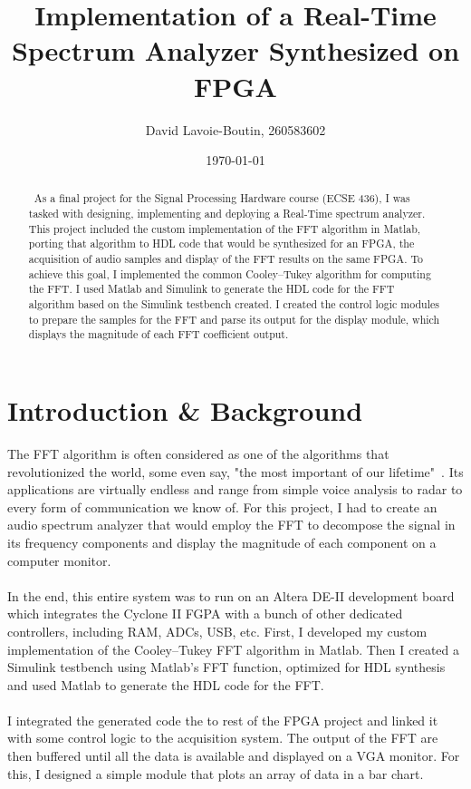 \documentclass[letterpaper, titlepage, 11pt]{article}
\title{Implementation of a Real-Time Spectrum Analyzer Synthesized on FPGA}
\author{David Lavoie-Boutin, 260583602}
\date{\today}
\begin{document}
\maketitle
\begin{abstract}\
As a final project for the Signal Processing Hardware course (ECSE 436), I was tasked with designing, implementing and deploying a Real-Time spectrum analyzer. This project included the custom implementation of the FFT algorithm in Matlab, porting that algorithm to HDL code that would be synthesized for an FPGA, the acquisition of audio samples and display of the FFT results on the same FPGA. To achieve this goal, I implemented the common Cooley–Tukey algorithm for computing the FFT. I used Matlab and Simulink to generate the HDL code for the FFT algorithm based on the Simulink testbench created. I created the control logic modules to prepare the samples for the FFT and parse its output for the display module, which displays the magnitude of each FFT coefficient output.
\end{abstract}

\tableofcontents
\clearpage

\section{Introduction \& Background}
The FFT algorithm is often considered as one of the algorithms that revolutionized the world, some even say, "the most important of our lifetime"~\cite{important}. Its applications are virtually endless and range from simple voice analysis to radar to every form of communication we know of. For this project, I had to create an audio spectrum analyzer that would employ the FFT to decompose the signal in its frequency components and display the magnitude of each component on a computer monitor. \\
\\
In the end, this entire system was to run on an Altera DE-II development board which integrates the Cyclone II FGPA with a bunch of other dedicated controllers, including RAM, ADCs, USB, etc. First, I developed my custom implementation of the Cooley–Tukey FFT algorithm in Matlab. Then I created a Simulink testbench using Matlab's FFT function, optimized for HDL synthesis and used Matlab to generate the HDL code for the FFT.\\
\\
I integrated the generated code the to rest of the FPGA project and linked it with some control logic to the acquisition system. The output of the FFT are then buffered until all the data is available and displayed on a VGA monitor. For this, I designed a simple module that plots an array of data in a bar chart.
\end{document}
